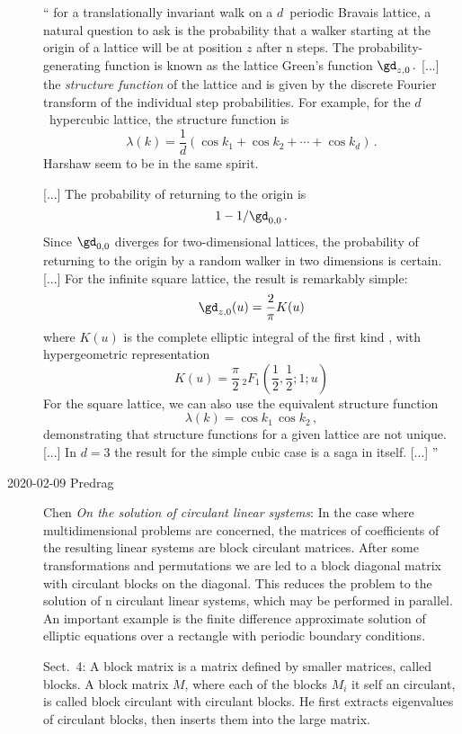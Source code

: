 \begin{description}
``
for a translationally invariant walk on a $d$\dmn\ periodic
Bravais lattice, a natural question to ask is the probability that a
walker starting at the origin of a lattice will be at position $z$ after
n steps. The probability-generating function is known as the lattice
Green's function
\(
\gd_{z,0}
\,.
\)
[...] the \emph{structure function} of the lattice and is given by the
discrete Fourier transform of the individual step probabilities. For
example, for the $d$\dmn\ hypercubic lattice, the structure function is
\[
\lambda(k) =
\frac{1}{d}
(\cos k_1 + \cos k_2 + \cdots + \cos k_d )
\,.
\]
Harshaw  seem to be in the same spirit.

[...] The probability of returning to the origin is
\[
1-1/\gd_{0,0}
\,.
\]
Since $\gd_{0,0}$ diverges for two-dimensional lattices, the probability
of returning to the origin by a random walker in two dimensions is
certain.
[...]
For the infinite square lattice, the result is remarkably simple:
\[
\gd_{z,0}(u) = \frac{2}{\pi}K(u)
\]
where $K(u)$ is the complete elliptic integral of the first kind
,
with hypergeometric representation
\[
  K(u) = \frac{\pi}{2}\,{}_2 F{}_1\left(\frac{1}{2},\frac{1}{2};1;u\right)
\]
For the square lattice, we can also use the equivalent structure function
\[
\lambda(k) =
\cos k_1 \, \cos k_2
\,,
\]
demonstrating that structure functions for a given lattice are not unique.
[...]
In $d=3$ the result for the simple cubic case is a saga in itself.
[...]
''

\item[2020-02-09 Predrag]
Chen {\em On the solution of circulant linear systems}:
In the case where multidimensional problems are concerned, the matrices
of coefficients of the resulting linear systems are block circulant
matrices. After some transformations and permutations we are led to a
block diagonal matrix with circulant blocks on the diagonal. This reduces
the problem to the solution of n circulant linear systems, which may be
performed in parallel. An important example is the finite difference
approximate solution of elliptic equations over a rectangle with periodic
boundary conditions.

Sect.~4:
A block matrix is a matrix defined by smaller matrices, called blocks.
A block matrix $M$, where each of the blocks $M_i$  it self an
circulant, is called block circulant with circulant blocks.
He first extracts eigenvalues of circulant blocks, then inserts them into the
large matrix.


\end{description}
